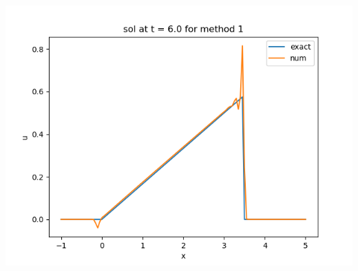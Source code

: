 \documentclass{article}
\begin{document}
\begin{enumerate}
\begin{center}
	\includegraphics[scale=.3]{hw13 sol t = 6 method 1}
\end{center}


\end{enumerate}
\end{document}
